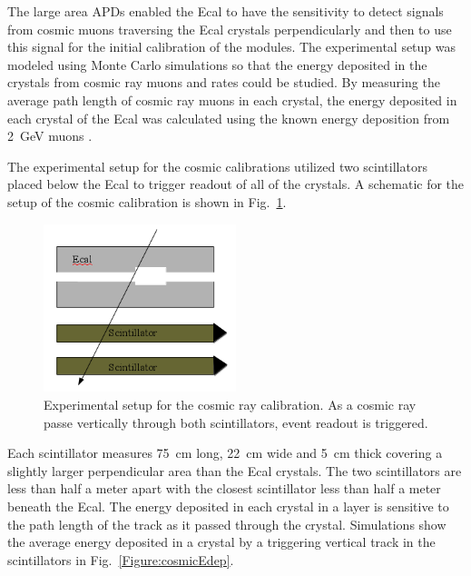 The large area APDs enabled the Ecal to have the sensitivity to detect signals from cosmic muons traversing the Ecal crystals perpendicularly and then to use this signal for the initial calibration of the modules. The experimental setup was modeled using Monte Carlo simulations so that the energy deposited in the crystals from cosmic ray muons and rates could be studied. By measuring the average path length of cosmic ray muons in each crystal, the energy deposited in each crystal of the Ecal was calculated using the known energy deposition from 2~GeV muons \cite{Olive}. 

The experimental setup for the cosmic calibrations utilized two scintillators placed below the Ecal to trigger readout of all of the crystals. A schematic for the setup of the cosmic calibration is shown in Fig.~\ref{Figure:cosmicScheme}.


\begin{figure}[H]
  \centering
      \includegraphics[width=0.5\textwidth]{pics/performance/cosmicschematic.png}
  \caption[Setup for Ecal cosmic ray calibration]{Experimental setup for the cosmic ray calibration. As a cosmic ray passe vertically through both scintillators, event readout is triggered.}
  \label{Figure:cosmicScheme}
\end{figure}

Each scintillator measures 75~cm long, 22~cm wide and 5~cm thick covering a slightly larger perpendicular area than the Ecal crystals. The two scintillators are less than half a meter apart with the closest scintillator less than half a meter beneath the Ecal. The energy deposited in each crystal in a layer is sensitive to the path length of the track as it passed through the crystal. Simulations show the average energy deposited in a crystal by a triggering vertical track in the scintillators in Fig.~\ref{Figure:cosmicEdep}.

